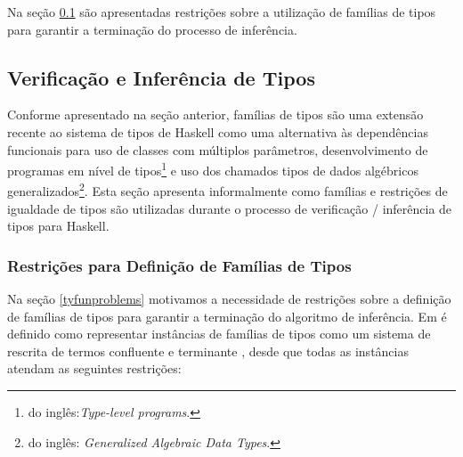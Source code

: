 Na se\c{c}\~ao \ref{tyfunverification} s\~ao apresentadas restri\c{c}\~oes sobre a utiliza\c{c}\~ao de fam\'ilias 
de tipos para  garantir a termina\c{c}\~ao do processo de infer\^encia.

\subsection{Verifica\c{c}\~ao e Infer\^encia de Tipos}\label{tyfunverification} 

Conforme apresentado na se\c{c}\~ao anterior, fam\'ilias de tipos s\~ao uma extens\~ao recente ao sistema de tipos de
Haskell como uma alternativa \`as depend\^encias funcionais para uso de classes com m\'ultiplos par\^ametros,
desenvolvimento de programas em n\'ivel de tipos\footnote{do ingl\^es:\emph{Type-level programs}.} e uso dos chamados
tipos de dados alg\'ebricos generalizados\footnote{do ingl\^es: \emph{Generalized Algebraic Data Types}.}. Esta 
se\c{c}\~ao apresenta informalmente como fam\'ilias e restri\c{c}\~oes de igualdade de tipos s\~ao utilizadas durante
o processo de verifica\c{c}\~ao / infer\^encia de tipos para Haskell.

\subsubsection{Restri\c{c}\~oes para Defini\c{c}\~ao de Fam\'ilias de Tipos}

Na se\c{c}\~ao \ref{tyfunproblems} motivamos a necessidade de restri\c{c}\~oes sobre a defini\c{c}\~ao de fam\'ilias de
tipos para garantir a termina\c{c}\~ao do algoritmo de infer\^encia. Em \cite{Schrijvers2008} \'e definido como 
representar inst\^ancias de fam\'ilias de tipos como um sistema de rescrita de termos  confluente e 
terminante \cite{Nipkow98}, desde que todas as inst\^ancias atendam as seguintes restri\c{c}\~oes:

